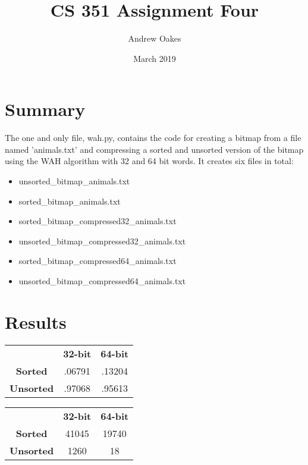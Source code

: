 \documentclass{article}
\title{CS 351 Assignment Four}
\author{Andrew Oakes}
\date{March 2019}
\begin{document}
\maketitle

\section{Summary}
The one and only file, wah.py, contains the code for creating a bitmap from a file named 'animals.txt' and compressing a sorted and unsorted version of the bitmap using the WAH algorithm with 32 and 64 bit words. It creates six files in total: 
\begin{itemize}
  \item unsorted\_bitmap\_animals.txt
  \item sorted\_bitmap\_animals.txt
  \item sorted\_bitmap\_compressed32\_animals.txt
  \item unsorted\_bitmap\_compressed32\_animals.txt
  \item sorted\_bitmap\_compressed64\_animals.txt
  \item unsorted\_bitmap\_compressed64\_animals.txt
\end{itemize}

\section{Results}

\begin{center}
 \label{tab:title}
\begin{tabular}{ c c c}
 & \textbf{32-bit} & \textbf{64-bit} \\ 
 \textbf{Sorted} & .06791 & .13204 \\  
 \textbf{Unsorted} & .97068 & .95613
 
\end{tabular}
\end{center}

\begin{center}
\begin{tabular}{ c c c}
 & \textbf{32-bit} & \textbf{64-bit} \\ 
 \textbf{Sorted} & 41045 & 19740 \\  
 \textbf{Unsorted} & 1260 & 18
 
\end{tabular}
\end{center}
\end{document}
